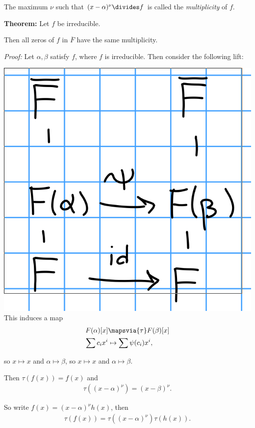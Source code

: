 The maximum \(\nu\) such that \((x-\alpha)^\nu \divides f\) is called
the \emph{multiplicity} of \(f\).

\textbf{Theorem:} Let \(f\) be irreducible.

Then all zeros of \(f\) in \(\overline F\) have the same multiplicity.

\emph{Proof:} Let \(\alpha, \beta\) satisfy \(f\), where \(f\) is
irreducible. Then consider the following lift:

\includegraphics{figures/2019-10-01-10:24.png}\\

This induces a map \begin{align*}
F(\alpha)[x] &\mapsvia{\tau} F(\beta)[x] \\
\sum c_i x^i &\mapsto \sum \psi(c_i) x^i
,\end{align*}

so \(x\mapsto x\) and \(\alpha \mapsto \beta\), so \(x\mapsto x\) and
\(\alpha \mapsto \beta\).

Then \(\tau(f(x)) = f(x)\) and
\begin{align*}
\tau((x-\alpha)^\nu) = (x-\beta)^\nu
.\end{align*}

So write \(f(x) = (x-\alpha)^\nu h(x)\), then
\begin{align*}
\tau(f(x)) = \tau((x-\alpha)^\nu) \tau(h(x))
.\end{align*}


